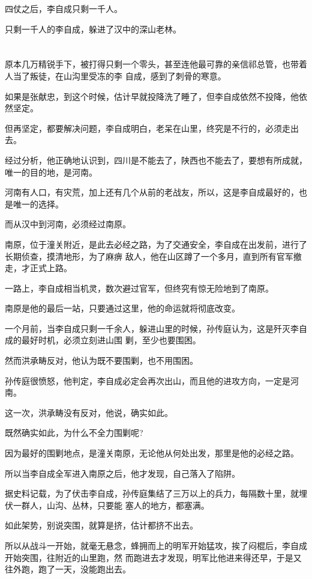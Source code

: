 \documentclass[11pt,a4paper,onecolumn]{article}
\begin{document}
四仗之后，李自成只剩一千人。

只剩一千人的李自成，躲进了汉中的深山老林。

\section[\thesection]{}

原本几万精锐手下，被打得只剩一个零头，甚至连他最可靠的亲信祁总管，也带着人当了叛徒，在山沟里受冻的李
自成，感到了刺骨的寒意。

如果是张献忠，到这个时候，估计早就投降洗了睡了，但李自成依然不投降，他依然坚定。

但再坚定，都要解决问题，李自成明白，老呆在山里，终究是不行的，必须走出去。

经过分析，他正确地认识到，四川是不能去了，陕西也不能去了，要想有所成就，唯一的目的地，是河南。

河南有人口，有灾荒，加上还有几个从前的老战友，所以，这是李自成最好的，也是唯一的选择。

而从汉中到河南，必须经过南原。

南原，位于潼关附近，是此去必经之路，为了交通安全，李自成在出发前，进行了长期侦查，摸清地形，为了麻痹
敌人，他在山区蹲了一个多月，直到所有官军撤走，才正式上路。

一路上，李自成相当机灵，数次避过官军，但终究有惊无险地到了南原。

南原是他的最后一站，只要通过这里，他的命运就将彻底改变。

一个月前，当李自成只剩一千余人，躲进山里的时候，孙传庭认为，这是歼灭李自成的最好时机，必须立刻进山围
剿，至少也要围困。

然而洪承畴反对，他认为既不要围剿，也不用围困。

孙传庭很愤怒，他判定，李自成必定会再次出山，而且他的进攻方向，一定是河南。

这一次，洪承畴没有反对，他说，确实如此。

既然确实如此，为什么不全力围剿呢?

因为最好的围剿地点，是潼关南原，无论他从何处出发，那里是他的必经之路。

所以当李自成全军进入南原之后，他才发现，自己落入了陷阱。

据史料记载，为了伏击李自成，孙传庭集结了三万以上的兵力，每隔数十里，就埋伏一群人，山沟、丛林，只要能
塞人的地方，都塞满。

如此架势，别说突围，就算是挤，估计都挤不出去。

所以从战斗一开始，就毫无悬念，蜂拥而上的明军开始猛攻，挨了闷棍后，李自成开始突围，往附近的山里跑，然
而跑进去才发现，明军比他进来得还早，于是又往外跑，跑了一天，没能跑出去。
\end{document}
